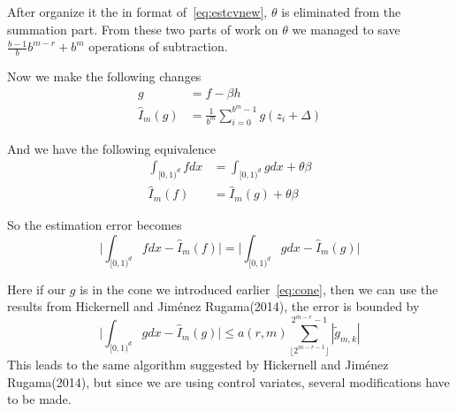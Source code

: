 After organize it the in format of~\eqref{eq:estcvnew}, $\theta$ is eliminated from the summation part. From these two parts of work on $\theta$ we managed to save $\frac{b-1}{b}b^{m-r}+b^m$ operations of subtraction.



Now we make the following changes 
\begin{align*}
    g&=f-\beta h\\ 
    \hat{I}_m({g})&= \frac{1}{b^m}\sum_{i=0}^{b^m-1}g(z_i+\Delta)
\end{align*}

And we have the following equivalence 
\begin{align*}
    \int_{[0,1)^d}fdx &= \int_{[0,1)^d}gdx +\theta\beta\\ 
    \hat{I}_m(f) &= \hat{I}_m(g)+\theta\beta
\end{align*}

So the estimation error becomes 
\[
\Big| \int_{[0,1)^d}fdx- \hat{I}_m(f) \Big|
    =\Big| \int_{[0,1)^d}gdx- \hat{I}_m(g) \Big|
\]

Here if our $g$ is in the cone we introduced earlier~\eqref{eq:cone}, then we can use the results from Hickernell and Jiménez Rugama(2014)\cite{hickernell2014reliable}, the error is bounded by
\[
\Big|\int_{[0,1)^d}gdx - \hat{I}_m(g)\Big| \leq a(r,m) \sum_{\lfloor 2^{m-r-1} \rfloor}^{2^{m-r}-1} |\tilde{g}_{m,k}|
\]
This leads to the same algorithm suggested by Hickernell and Jiménez Rugama(2014)\cite{hickernell2014reliable}, but since we are using control variates, several modifications have to be made.


